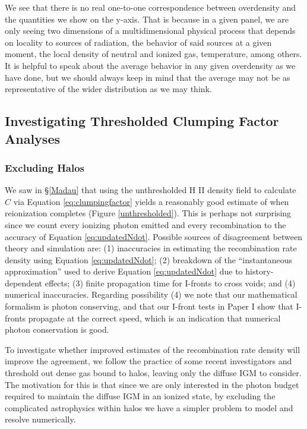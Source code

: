 We see that there is no real one-to-one correspondence between overdensity and the quantities we show on the y-axis.  That is because in a given panel, we are only seeing two dimensions of a multidimensional physical process that depends on locality to sources of radiation, the behavior of said sources at a given moment, the local density of neutral and ionized gas, temperature, among others.  It is helpful to speak about the average behavior in any given overdensity as we have done, but we should always keep in mind that the average may not be as representative of the wider distribution as we may think.

\subsection{Investigating Thresholded Clumping Factor Analyses}
\subsubsection{Excluding Halos}
\label{ExcludingHalos}

We saw in \S\ref{Madau} that using the unthresholded H {\footnotesize II} density field to calculate $C$ via Equation \eqref{eq:clumpingfactor} yields a reasonably good estimate of when reionization completes (Figure \ref{unthresholded}). This is perhaps not surprising since we count every ionizing photon emitted and every recombination to the accuracy of Equation \eqref{eq:updatedNdot}. Possible sources of disagreement between theory and simulation are: (1) inaccuracies in estimating the recombination rate density using Equation \eqref{eq:updatedNdot}; (2) breakdown of the ``instantaneous approximation'' used to derive Equation \eqref{eq:updatedNdot} due to history-dependent effects; (3) finite propagation time for I-fronts to cross voids; and (4) numerical inaccuracies. Regarding possibility (4) we note that our mathematical formalism is photon conserving, and that our I-front tests in Paper I show that I-fronts propagate at the correct speed, which is an indication that numerical photon conservation is good. 

To investigate whether improved estimates of the recombination rate density will improve the agreement, we follow the practice of some recent investigators \citep{PawlikEtAl2009, RaicevicTheuns2011} and threshold out dense gas bound to halos, leaving only the diffuse IGM to consider. The motivation for this is that since we are only interested in the photon budget required to maintain the diffuse IGM in an ionized state, by excluding the complicated astrophysics within halos we have a simpler problem to model and resolve numerically. 

